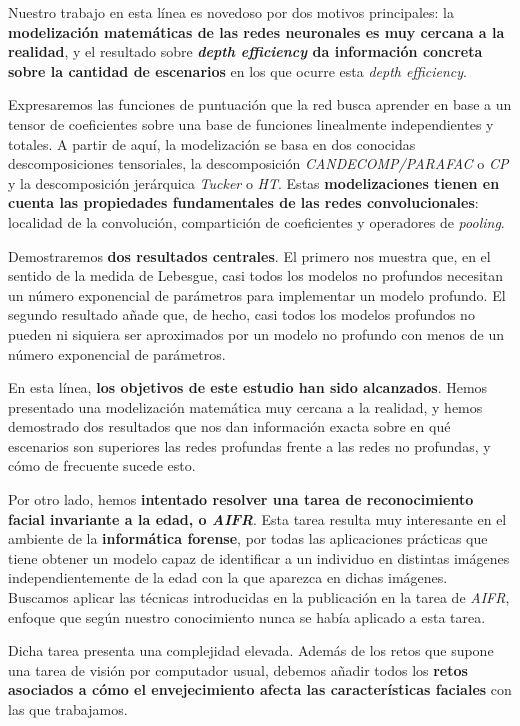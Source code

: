 Nuestro trabajo en esta línea es novedoso por dos motivos principales: la \textbf{modelización matemáticas de las redes neuronales es muy cercana a la realidad}, y el resultado sobre \textbf{\textit{depth efficiency} da información concreta sobre la cantidad de escenarios} en los que ocurre esta \textit{depth efficiency}.

Expresaremos las funciones de puntuación que la red busca aprender en base a un tensor de coeficientes sobre una base de funciones linealmente independientes y totales. A partir de aquí, la modelización se basa en dos conocidas descomposiciones tensoriales, la descomposición \textit{CANDECOMP/PARAFAC} o \textit{CP} y la descomposición jerárquica \textit{Tucker} o \textit{HT}. Estas \textbf{modelizaciones tienen en cuenta las propiedades fundamentales de las redes convolucionales}: localidad de la convolución, compartición de coeficientes y operadores de \textit{pooling}.

Demostraremos \textbf{dos resultados centrales}. El primero nos muestra que, en el sentido de la medida de Lebesgue, casi todos los modelos no profundos necesitan un número exponencial de parámetros para implementar un modelo profundo. El segundo resultado añade que, de hecho, casi todos los modelos profundos no pueden ni siquiera ser aproximados por un modelo no profundo con menos de un número exponencial de parámetros.

En esta línea, \textbf{los objetivos de este estudio han sido alcanzados}. Hemos presentado una modelización matemática muy cercana a la realidad, y hemos demostrado dos resultados que nos dan información exacta sobre en qué escenarios son superiores las redes profundas frente a las redes no profundas, y cómo de frecuente sucede esto.

Por otro lado, hemos \textbf{intentado resolver una tarea de reconocimiento facial invariante a la edad, o \textit{AIFR}}. Esta tarea resulta muy interesante en el ambiente de la \textbf{informática forense}, por todas las aplicaciones prácticas que tiene obtener un modelo capaz de identificar a un individuo en distintas imágenes independientemente de la edad con la que aparezca en dichas imágenes. Buscamos aplicar las técnicas introducidas en la publicación \cite{informatica:principal} en la tarea de \textit{AIFR}, enfoque que según nuestro conocimiento nunca se había aplicado a esta tarea.

Dicha tarea presenta una complejidad elevada. Además de los retos que supone una tarea de visión por computador usual, debemos añadir todos los \textbf{retos asociados a cómo el envejecimiento afecta las características faciales} con las que trabajamos.

